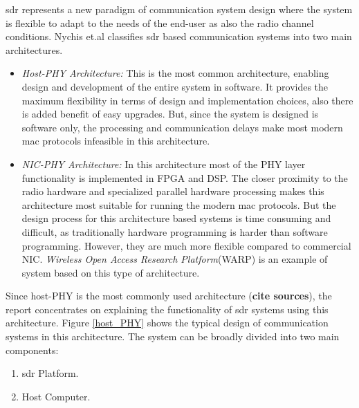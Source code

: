 \ac{sdr} represents a new paradigm of communication system design where the system is flexible to adapt to the needs of the end-user as also the radio channel conditions. Nychis et.al \cite{nychis_enabling_nodate} classifies \ac{sdr} based communication systems into two main architectures.
\begin{itemize} 
\item{\textit{Host-PHY Architecture:} This is the most common architecture, enabling design and development of the entire system in software.
It provides the maximum flexibility in terms of design and implementation choices, also there is added benefit of easy upgrades.
But, since the system is designed is software only, the processing and communication delays make most modern \ac{mac} protocols infeasible in this architecture.}


\item{\textit{NIC-PHY Architecture:} In this architecture most of the \ac{PHY} layer functionality is implemented in \ac{FPGA} and \ac{DSP}.
The closer proximity to the radio hardware and specialized parallel hardware processing makes this architecture most suitable for running the modern \ac{mac} protocols.
But the design process for this architecture based systems is time consuming and difficult, as traditionally hardware programming is harder than software programming.
However, they are much more flexible compared to commercial \ac{NIC}.
\textit{Wireless Open Access Research Platform}(WARP) \cite{noauthor_warp_nodate} is an example of system based on this type of architecture.}

\end{itemize}
Since host-PHY \cite{nychis_enabling_nodate} is the most commonly used architecture (\textbf{cite sources}), the report concentrates on explaining the functionality of \ac{sdr} systems using this architecture.
Figure \ref{host_PHY} shows the typical design of communication systems in this architecture. The system can be broadly divided into two main components:
\begin{enumerate}
\item{\ac{sdr} Platform.}
\item{Host Computer.}
\end{enumerate}

